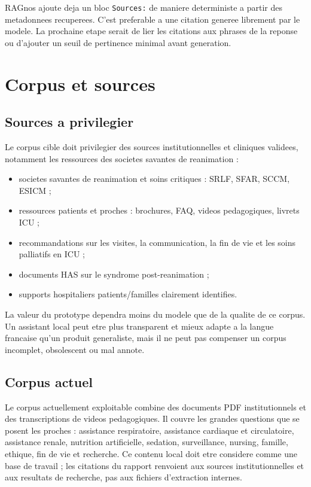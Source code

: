 \documentclass[11pt,a4paper]{article}
\begin{document}
RAGnos ajoute deja un bloc \texttt{Sources:} de maniere deterministe a partir des metadonnees recuperees. C'est preferable a une citation generee librement par le modele. La prochaine etape serait de lier les citations aux phrases de la reponse ou d'ajouter un seuil de pertinence minimal avant generation.

\section{Corpus et sources}

\subsection{Sources a privilegier}

Le corpus cible doit privilegier des sources institutionnelles et cliniques validees, notamment les ressources des societes savantes de reanimation \autocite{sccmPatientFamilyResources,esicmPatientFamily,icsPatientResources,sfarInfoPatientsRea,srlfVisitesProches} :

\begin{itemize}
  \item societes savantes de reanimation et soins critiques : SRLF, SFAR, SCCM, ESICM ;
  \item ressources patients et proches : brochures, FAQ, videos pedagogiques, livrets ICU ;
  \item recommandations sur les visites, la communication, la fin de vie et les soins palliatifs en ICU ;
  \item documents HAS sur le syndrome post-reanimation ;
  \item supports hospitaliers patients/familles clairement identifies.
\end{itemize}

La valeur du prototype dependra moins du modele que de la qualite de ce corpus. Un assistant local peut etre plus transparent et mieux adapte a la langue francaise qu'un produit generaliste, mais il ne peut pas compenser un corpus incomplet, obsolescent ou mal annote.

\subsection{Corpus actuel}

Le corpus actuellement exploitable combine des documents PDF institutionnels et des transcriptions de videos pedagogiques. Il couvre les grandes questions que se posent les proches : assistance respiratoire, assistance cardiaque et circulatoire, assistance renale, nutrition artificielle, sedation, surveillance, nursing, famille, ethique, fin de vie et recherche. Ce contenu local doit etre considere comme une base de travail ; les citations du rapport renvoient aux sources institutionnelles et aux resultats de recherche, pas aux fichiers d'extraction internes.
\end{document}

